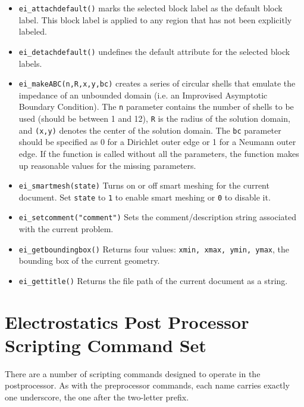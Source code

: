 \begin{itemize}
\item{\tt ei\_attachdefault()} marks the
selected block label as the default block label.  This block label
is applied to any region that has not been explicitly labeled.

\item{\tt ei\_detachdefault()} undefines the default
attribute for the selected block labels.

\item{\tt ei\_makeABC(n,R,x,y,bc)} creates a series of circular shells that emulate the
impedance of an unbounded domain (i.e. an Improvised Asymptotic Boundary
Condition).  The {\tt n} parameter contains the number of shells to be used
(should be between 1 and 12), {\tt R} is the radius of the solution domain, and
{\tt (x,y)} denotes the center of the solution domain.  The {\tt bc} parameter should
be specified as 0 for a Dirichlet outer edge or 1 for a Neumann outer edge.
If the function is called without all the parameters, the function makes up
reasonable values for the missing parameters.

\item{\tt ei\_smartmesh(state)} Turns on or off smart meshing for the current document.  Set {\tt state} to {\tt 1} to enable smart meshing or {\tt 0} to disable it.

\item{\tt ei\_setcomment("comment")} Sets the comment/description string associated with the current problem.

\item{\tt ei\_getboundingbox()} Returns four values: {\tt xmin, xmax, ymin, ymax}, the bounding box of the current geometry.

\item{\tt ei\_gettitle()} Returns the file path of the current document as a string.

\end{itemize}

\section{Electrostatics Post Processor Scripting Command Set}

There are a number of scripting commands designed to operate in
the postprocessor. As with the preprocessor commands, each name
carries exactly one underscore, the one after the two-letter prefix.


